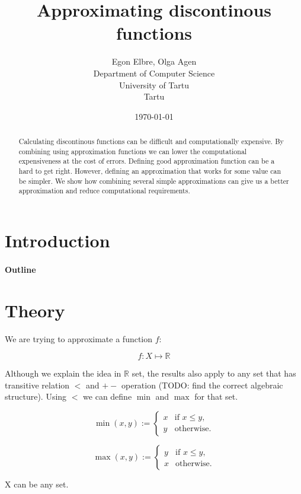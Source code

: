 \documentclass [12pt]{article} %
\title{Approximating discontinous functions}
\author{
    Egon Elbre, Olga Agen \\
        Department of Computer Science \\
    University of Tartu\\
    Tartu\\
}
\date{\today}
\begin{document}
\maketitle

\begin{abstract}
Calculating discontinous functions can be difficult and computationally
expensive. By combining using approximation functions we can lower 
the computational expensiveness at the cost of errors.
Defining good approximation function can be a hard to get right. 
However, defining an approximation that works for some value can 
be simpler. We show how combining several simple approximations 
can give us a better approximation and reduce computational requirements.
\end{abstract}

\section{Introduction}

\paragraph{Outline}

\section{Theory}

\newcommand{\Real}{\mathbb{R}}
\newcommand{\defas}{ := }
\newcommand{\err}[1]{\varepsilon_{#1}}

We are trying to approximate a function $f$:

$$f : X \mapsto \Real$$

Although we explain the idea in $\Real$ set, the results also apply to 
any set that has transitive relation $<$ and $+-$ operation (TODO: find the correct algebraic structure). 
Using $<$ we can define $\min$ and $\max$ for that set.

$$ \min(x,y) \defas \begin{cases}
    x & \text{if $x \leq y$}, \\
    y & \text{otherwise}.
\end{cases}
$$

$$
\max(x,y) \defas \begin{cases}
    y & \text{if $x \leq y$}, \\
    x & \text{otherwise}.
\end{cases}
$$

X can be any set.
\end{document}

